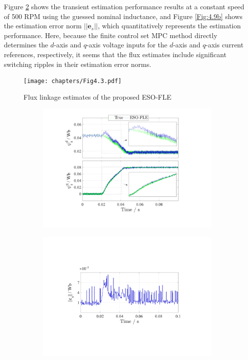 Figure \ref{Fig:4.9a} shows the transient estimation performance results at a constant speed of 500 RPM using the guessed nominal inductance, and Figure \ref{Fig:4.9b} shows the estimation error norm $||\mathbf{e}_s||$, which quantitatively represents the estimation performance. Here, because the finite control set MPC method directly determines the $d$-axis and $q$-axis voltage inputs for the $d$-axis and $q$-axis current references, respectively, it seems that the flux estimates include significant switching ripples in their estimation error norms. \begin{figure}[!h]
    \centering
    \texttt{[image: chapters/Fig4.3.pdf]}
    \caption{Flux linkage estimates of the proposed ESO-FLE}
    \label{Fig:4.3}
\end{figure} \begin{figure}[h!]
    \centering
    \begin{subfigure}[c]{1.0\columnwidth}
        \centering
        \includegraphics[scale=0.48]{chapters/Fig4.9a.pdf}
        \caption{}
        \label{Fig:4.9a}
    \end{subfigure}
    \vfill
    \begin{subfigure}[c]{1.0\columnwidth}
        \centering
        \includegraphics[scale=0.48]{chapters/Fig4.9b.pdf}

\end{subfigure}
\end{figure}
